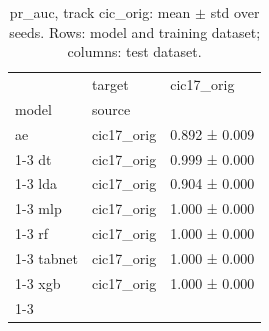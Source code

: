 \begin{table}
\caption{pr_auc, track cic_orig: mean $\pm$ std over seeds. Rows: model and training dataset; columns: test dataset.}
\label{tab:matrix_cic_orig_pr_auc}
\begin{tabular}{lll}
\toprule
 & target & cic17_orig \\
model & source &  \\
\midrule
ae & cic17_orig & 0.892 ± 0.009 \\
\cline{1-3}
dt & cic17_orig & 0.999 ± 0.000 \\
\cline{1-3}
lda & cic17_orig & 0.904 ± 0.000 \\
\cline{1-3}
mlp & cic17_orig & 1.000 ± 0.000 \\
\cline{1-3}
rf & cic17_orig & 1.000 ± 0.000 \\
\cline{1-3}
tabnet & cic17_orig & 1.000 ± 0.000 \\
\cline{1-3}
xgb & cic17_orig & 1.000 ± 0.000 \\
\cline{1-3}
\bottomrule
\end{tabular}
\end{table}
